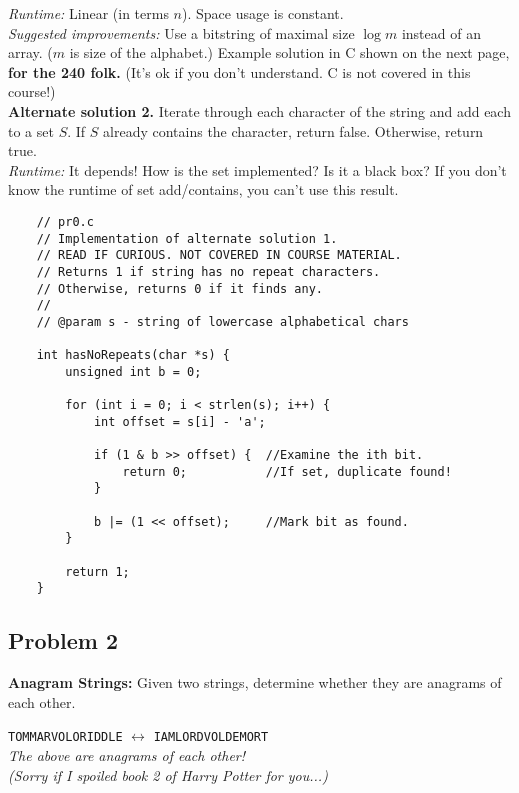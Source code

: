 \textit{Runtime:} Linear (in terms $n$). Space usage is constant.\\

\textit{Suggested improvements:} Use a bitstring of maximal size $\log m$ instead of an array. ($m$ is size of the alphabet.) Example solution in C shown on the next page, \textbf{for the 240 folk.} (It's ok if you don't understand. C is not covered in this course!)\\

\textbf{Alternate solution 2.} Iterate through each character of the string and add each to a set $S$. If $S$ already contains the character, return false. Otherwise, return true.\\

\textit{Runtime:} It depends! How is the set implemented? Is it a black box? If you don't know the runtime of set add/contains, you can't use this result.\\

\begin{verbatim}
    // pr0.c
    // Implementation of alternate solution 1.
    // READ IF CURIOUS. NOT COVERED IN COURSE MATERIAL.
    // Returns 1 if string has no repeat characters.
    // Otherwise, returns 0 if it finds any.
    // 
    // @param s - string of lowercase alphabetical chars

    int hasNoRepeats(char *s) {
        unsigned int b = 0;

        for (int i = 0; i < strlen(s); i++) {
            int offset = s[i] - 'a';

            if (1 & b >> offset) {  //Examine the ith bit.
                return 0;           //If set, duplicate found!
            }

            b |= (1 << offset);     //Mark bit as found.
        }

        return 1;
    }
\end{verbatim}
\mbox{}\vspace{20pt}


\subsection*{Problem 2}

\textbf{Anagram Strings:} Given two strings, determine whether they are anagrams of each other.

\begin{center}
    \texttt{TOMMARVOLORIDDLE} $\longleftrightarrow$ \texttt{IAMLORDVOLDEMORT}\\

    \textit{The above are anagrams of each other!\\ (Sorry if I spoiled book 2 of Harry Potter for you...)}
\end{center}

